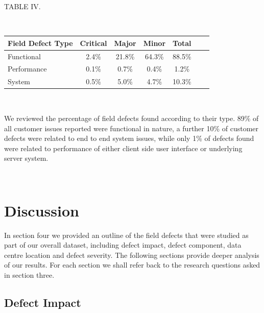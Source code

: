\documentclass[conference]{IEEEtran}
\begin{document}
TABLE IV.

\ \ 

\begin{tabular}{l*{5}{c}r} Field Defect Type & Critical & Major & Minor &  Total \\ \hline Functional & 2.4\%	 & 21.8\%	& 64.3\%	& 88.5\% \\ Performance & 0.1\% & 0.7\% & 0.4\% & 1.2\% \\ System & 0.5\% & 5.0\% & 4.7\% & 10.3\%   \end{tabular}

\ \ 

We reviewed the percentage of field defects found according to their type. 89\% of all customer issues reported were functional in nature, a further 10\% of customer defects were related to end to end system issues, while only 1\% of defects found were related to performance of either client side user interface or underlying server system. 

\ \

\section{Discussion}

In section four we provided an outline of the field defects that were studied as part of our overall dataset, including defect impact, defect component, data centre location and defect severity. The following sections provide deeper analysis of our results. For each section we shall refer back to the research questions asked in section three.

\subsection{Defect Impact}
\end{document}
